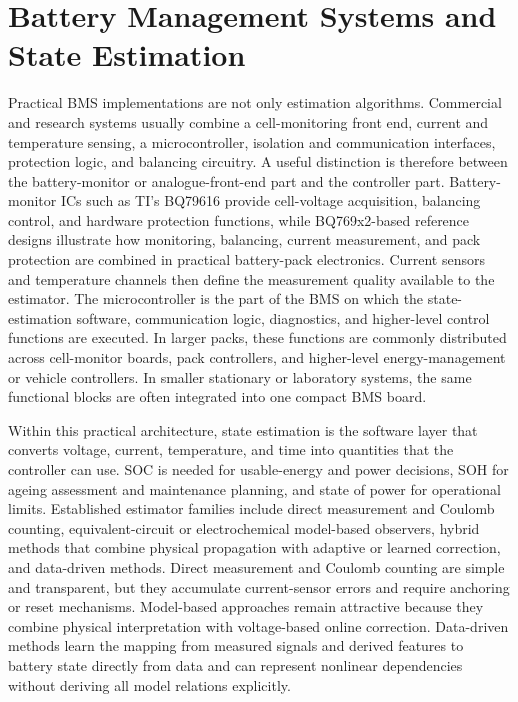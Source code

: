 \documentclass[
    a4paper,
    12pt,
    titlepage,
    bibliography=totoc,
    twoside=on,
    parskip=false,
    numbers=noenddot,
    cleardoublepage=empty,
    DIV=12,
    BCOR=12.0mm,
    headheight=36pt,
    headings=openright
]{scrreprt}
\begin{document}
\section{Battery Management Systems and State Estimation}
Practical BMS implementations are not only estimation algorithms. Commercial and research systems usually combine a cell-monitoring front end, current and temperature sensing, a microcontroller, isolation and communication interfaces, protection logic, and balancing circuitry. A useful distinction is therefore between the battery-monitor or analogue-front-end part and the controller part. Battery-monitor ICs such as TI's BQ79616 provide cell-voltage acquisition, balancing control, and hardware protection functions, while BQ769x2-based reference designs illustrate how monitoring, balancing, current measurement, and pack protection are combined in practical battery-pack electronics.\autocite{BQ7961616SeriesBattery2023,10sBatteryPack,DesignConsiderationsCurrent} Current sensors and temperature channels then define the measurement quality available to the estimator.\autocite{TLE4972HighPrecision,TMCS11083Functional} The microcontroller is the part of the BMS on which the state-estimation software, communication logic, diagnostics, and higher-level control functions are executed. In larger packs, these functions are commonly distributed across cell-monitor boards, pack controllers, and higher-level energy-management or vehicle controllers. In smaller stationary or laboratory systems, the same functional blocks are often integrated into one compact BMS board.

Within this practical architecture, state estimation is the software layer that converts voltage, current, temperature, and time into quantities that the controller can use. SOC is needed for usable-energy and power decisions, SOH for ageing assessment and maintenance planning, and state of power for operational limits.\autocite{plettBatteryManagementSystems2015,shrivastavaReviewTechnologicalAdvancement2023,jiangAdvancesBatteryState2024} Established estimator families include direct measurement and Coulomb counting, equivalent-circuit or electrochemical model-based observers, hybrid methods that combine physical propagation with adaptive or learned correction, and data-driven methods.\autocite{khanComparativeStudyDifferent2022,gaoEnhancedStateofchargeEstimation2022,guoSystematicReviewElectrochemical2024,sunEquivalentCircuitModels2026} Direct measurement and Coulomb counting are simple and transparent, but they accumulate current-sensor errors and require anchoring or reset mechanisms. Model-based approaches remain attractive because they combine physical interpretation with voltage-based online correction. Data-driven methods learn the mapping from measured signals and derived features to battery state directly from data and can represent nonlinear dependencies without deriving all model relations explicitly.\autocite{hossainlipuDatadrivenStateCharge2020,zhaoReviewLithiumIonBattery2024,laudaniComprehensiveReviewEquivalent2026}
\end{document}
